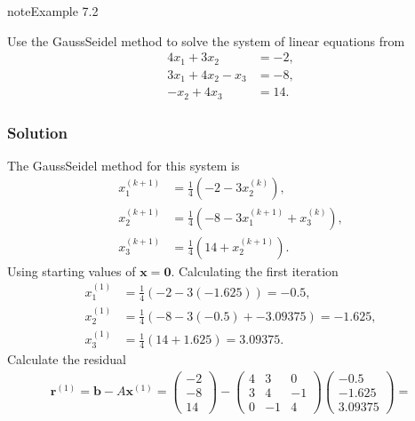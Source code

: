 \documentclass[letterpaper,10pt,english]{jupyterBook}
\begin{document}
\begin{sphinxadmonition}{note}{Example 7.2}

\sphinxAtStartPar
Use the Gauss\sphinxhyphen{}Seidel method to solve the system of linear equations from {\hyperref[\detokenize{7_Indirect_methods/7.1_Jacobi_method:jacobi-method-example}]{}}
\begin{align*}
    4x_1 +3x_2 &=-2,\\
    3x_1 +4x_2 -x_3 &=-8,\\
    -x_2 +4x_3 &=14.
\end{align*}\subsubsection*{Solution}

\sphinxAtStartPar
The Gauss\sphinxhyphen{}Seidel method for this system is
\begin{align*}
    x_{1}^{(k+1)} &= \frac{1}{4} \left( -2 - 3 x_{2}^{(k)} \right), \\
    x_{2}^{(k+1)} &= \frac{1}{4} \left( -8 - 3 x_{1}^{(k+1)} + x_{3}^{(k)} \right), \\
    x_{3}^{(k+1)} &= \frac{1}{4} \left( 14 + x_{2}^{(k+1)} \right).
\end{align*}
\sphinxAtStartPar
Using starting values of \(\mathbf{x} = \mathbf{0}\). Calculating the first iteration
\begin{align*}
    x_{1}^{(1)} &= \frac{1}{4} \left( -2 - 3 (-1.625) \right) = -0.5, \\
    x_{2}^{(1)} &= \frac{1}{4} \left( -8 - 3 (-0.5) + -3.09375 \right) = -1.625, \\
    x_{3}^{(1)} &= \frac{1}{4} \left( 14 + 1.625 \right) = 3.09375.
\end{align*}
\sphinxAtStartPar
Calculate the residual
\begin{align*}
    \mathbf{r}^{(1)} = \mathbf{b} - A \mathbf{x}^{(1)} = 
    \begin{pmatrix} -2 \\ -8 \\ 14 \end{pmatrix} -
    \begin{pmatrix} 4 & 3 & 0 \\ 3 & 4 & -1 \\ 0 & -1 & 4 \end{pmatrix}
    \begin{pmatrix} -0.5 \\ -1.625 \\ 3.09375 \end{pmatrix} =

\end{align*}
\end{sphinxadmonition}
\end{document}
